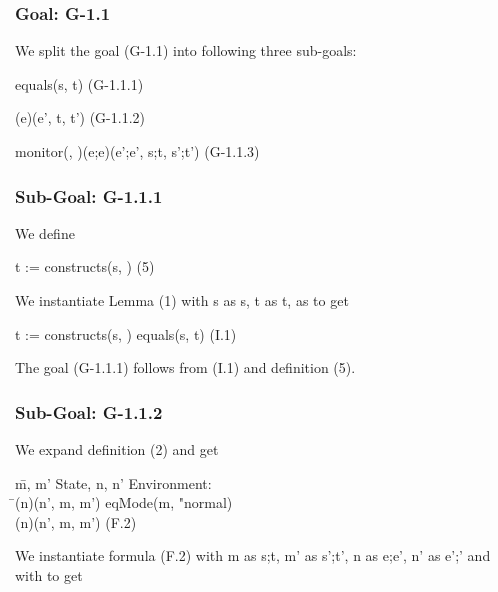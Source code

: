 \documentclass[conference]{IEEEtran}
\begin{document}
 \subsubsection*{Goal: G-1.1}

\noindent We split the goal (G-1.1) into following three sub-goals:

equals(s, t)  \hspace*{4.2cm}(G-1.1.1)


\textlbrackdbl \textrbrackdbl(e)(e', t, t')  \hspace*{3.3cm}(G-1.1.2)


monitor(, )(e;e)(e';e', s;t, s';t')  \hspace*{0.4cm}(G-1.1.3)


\subsubsection*{Sub-Goal: G-1.1.1}

\noindent We define

\begin{center}
t := constructs(s, )  \hspace*{3cm} (5)
\end{center}

\noindent We instantiate Lemma (1) with 
s as s, t as t,  as  to get
\begin{center}
t := constructs(s, )  equals(s, t) \hspace*{2cm} (I.1)
\end{center}

\noindent The goal (G-1.1.1) follows from (I.1) and definition (5). 

\subsubsection*{Sub-Goal: G-1.1.2}

\noindent We expand definition (2) and get

\begin{center}
\begin{tabbing}
 \=m, m'  State, n, n'  Environment: 
\\\>\textlbrackdbl \=\textrbrackdbl(n)(n', m, m')  eqMode(m, "normal) 
\\\>\> \textlbrackdbl \textrbrackdbl(n)(n', m, m')  \hspace*{4cm} (F.2)
\end{tabbing}
\end{center}

\noindent We instantiate formula (F.2) with
m as s;t, m' as s';t', n as e;e', n' as e';' and  with  to get
\end{document}
